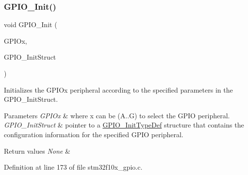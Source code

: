 \mbox{\label{group___g_p_i_o___exported___functions_ga71abf9404261370d03cca449b88d3a65}} 
\subsubsection{\texorpdfstring{G\+P\+I\+O\+\_\+\+Init()}{GPIO\_Init()}}
{\footnotesize\ttfamily void G\+P\+I\+O\+\_\+\+Init (\begin{DoxyParamCaption}\item[{\hyperlink{struct_g_p_i_o___type_def}{G\+P\+I\+O\+\_\+\+Type\+Def} $\ast$}]{G\+P\+I\+Ox,  }\item[{\hyperlink{struct_g_p_i_o___init_type_def}{G\+P\+I\+O\+\_\+\+Init\+Type\+Def} $\ast$}]{G\+P\+I\+O\+\_\+\+Init\+Struct }\end{DoxyParamCaption})}



Initializes the G\+P\+I\+Ox peripheral according to the specified parameters in the G\+P\+I\+O\+\_\+\+Init\+Struct. 


\begin{DoxyParams}{Parameters}
{\em G\+P\+I\+Ox} & where x can be (A..G) to select the G\+P\+IO peripheral. \\
\hline
{\em G\+P\+I\+O\+\_\+\+Init\+Struct} & pointer to a \hyperlink{struct_g_p_i_o___init_type_def}{G\+P\+I\+O\+\_\+\+Init\+Type\+Def} structure that contains the configuration information for the specified G\+P\+IO peripheral. \\
\hline
\end{DoxyParams}

\begin{DoxyRetVals}{Return values}
{\em None} & \\
\hline
\end{DoxyRetVals}


Definition at line 173 of file stm32f10x\+\_\+gpio.\+c.

